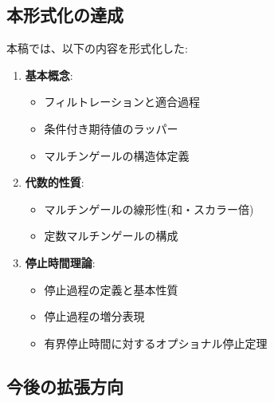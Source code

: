 \documentclass[a4paper,12pt]{ltjsarticle}
\theoremstyle{definition}
\begin{document}
\subsection{本形式化の達成}

本稿では、以下の内容を形式化した:

\begin{enumerate}
\item \textbf{基本概念}:
  \begin{itemize}
  \item フィルトレーションと適合過程
  \item 条件付き期待値のラッパー
  \item マルチンゲールの構造体定義
  \end{itemize}

\item \textbf{代数的性質}:
  \begin{itemize}
  \item マルチンゲールの線形性(和・スカラー倍)
  \item 定数マルチンゲールの構成
  \end{itemize}

\item \textbf{停止時間理論}:
  \begin{itemize}
  \item 停止過程の定義と基本性質
  \item 停止過程の増分表現
  \item 有界停止時間に対するオプショナル停止定理
  \end{itemize}
\end{enumerate}

\subsection{今後の拡張方向}
\end{document}
